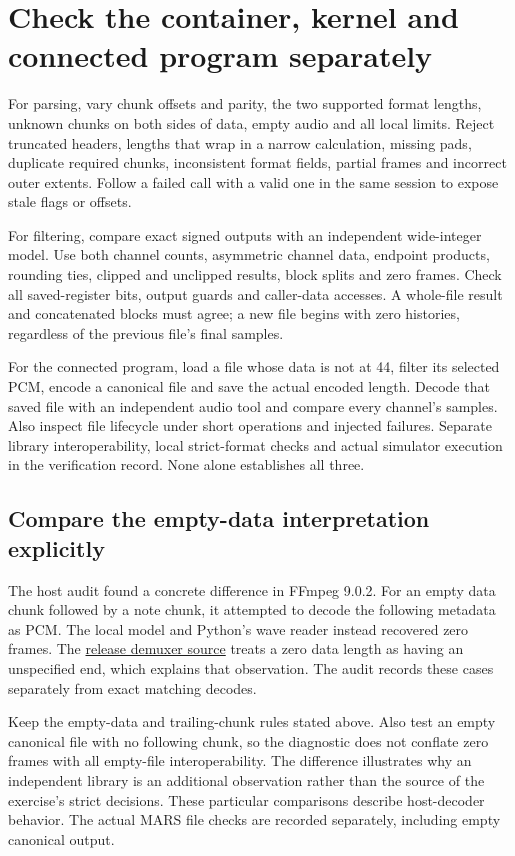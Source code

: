 \section{Check the container, kernel and connected program separately}
For parsing, vary chunk offsets and parity, the two supported format lengths, unknown
chunks on both sides of data, empty audio and all local limits. Reject truncated
headers, lengths that wrap in a narrow calculation, missing pads, duplicate required
chunks, inconsistent format fields, partial frames and incorrect outer extents. Follow
a failed call with a valid one in the same session to expose stale flags or offsets.

For filtering, compare exact signed outputs with an independent wide-integer model.
Use both channel counts, asymmetric channel data, endpoint products, rounding ties,
clipped and unclipped results, block splits and zero frames. Check all saved-register
bits, output guards and caller-data accesses. A whole-file result and concatenated
blocks must agree; a new file begins with zero histories, regardless of the previous
file's final samples.

For the connected program, load a file whose data is not at 44, filter its selected
PCM, encode a canonical file and save the actual encoded length. Decode that saved
file with an independent audio tool and compare every channel's samples. Also inspect
file lifecycle under short operations and injected failures. Separate library
interoperability, local strict-format checks and actual simulator execution in the
verification record. None alone establishes all three.

\subsection*{Compare the empty-data interpretation explicitly}
The host audit found a concrete difference in FFmpeg 9.0.2. For an empty data chunk
followed by a note chunk, it attempted to decode the following metadata as PCM.
The local model and Python's wave reader instead recovered zero frames. The
\href{https://github.com/FFmpeg/FFmpeg/blob/n9.0.2/libavformat/wavdec.c}{release demuxer source}
treats a zero data length as having an unspecified end, which explains that observation.
The audit records these cases separately from exact matching decodes.

Keep the empty-data and trailing-chunk rules stated above. Also test an empty canonical
file with no following chunk, so the diagnostic does not conflate zero frames with
all empty-file interoperability. The difference illustrates why an independent library
is an additional observation rather than the source of the exercise's strict decisions.
These particular comparisons describe host-decoder behavior. The actual MARS file
checks are recorded separately, including empty canonical output.
